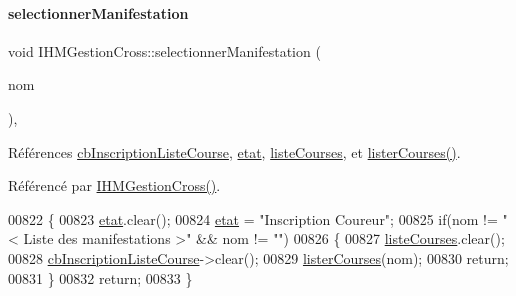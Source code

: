 \paragraph{\texorpdfstring{selectionner\+Manifestation}{selectionnerManifestation}}
{\footnotesize\ttfamily void I\+H\+M\+Gestion\+Cross\+::selectionner\+Manifestation (\begin{DoxyParamCaption}\item[{Q\+String}]{nom }\end{DoxyParamCaption})\hspace{0.3cm}{\ttfamily [private]}, {\ttfamily [slot]}}



Références \hyperlink{class_i_h_m_gestion_cross_aff44e6f1a225ee5b55783afe72049f83}{cb\+Inscription\+Liste\+Course}, \hyperlink{class_i_h_m_gestion_cross_a5da4390d71dbd5d05cff339f93c7c85a}{etat}, \hyperlink{class_i_h_m_gestion_cross_a66fc14c0ed874e72b6ada34e9b83603a}{liste\+Courses}, et \hyperlink{class_i_h_m_gestion_cross_a34567afe3e94862ebd9af51528dedb65}{lister\+Courses()}.



Référencé par \hyperlink{class_i_h_m_gestion_cross_a2c62fd83326a87456a403f46acc408c8}{I\+H\+M\+Gestion\+Cross()}.


\begin{DoxyCode}
00822 \{
00823     \hyperlink{class_i_h_m_gestion_cross_a5da4390d71dbd5d05cff339f93c7c85a}{etat}.clear();
00824     \hyperlink{class_i_h_m_gestion_cross_a5da4390d71dbd5d05cff339f93c7c85a}{etat} = \textcolor{stringliteral}{"Inscription Coureur"};
00825     \textcolor{keywordflow}{if}(nom != \textcolor{stringliteral}{"< Liste des manifestations >"} && nom != \textcolor{stringliteral}{""})
00826     \{
00827         \hyperlink{class_i_h_m_gestion_cross_a66fc14c0ed874e72b6ada34e9b83603a}{listeCourses}.clear();
00828         \hyperlink{class_i_h_m_gestion_cross_aff44e6f1a225ee5b55783afe72049f83}{cbInscriptionListeCourse}->clear();
00829         \hyperlink{class_i_h_m_gestion_cross_a34567afe3e94862ebd9af51528dedb65}{listerCourses}(nom);
00830         \textcolor{keywordflow}{return};
00831     \}
00832     \textcolor{keywordflow}{return};
00833 \}
\end{DoxyCode}
\mbox{\label{class_i_h_m_gestion_cross_a4fd00fda0e47366d66d046e344a1617e}} 
